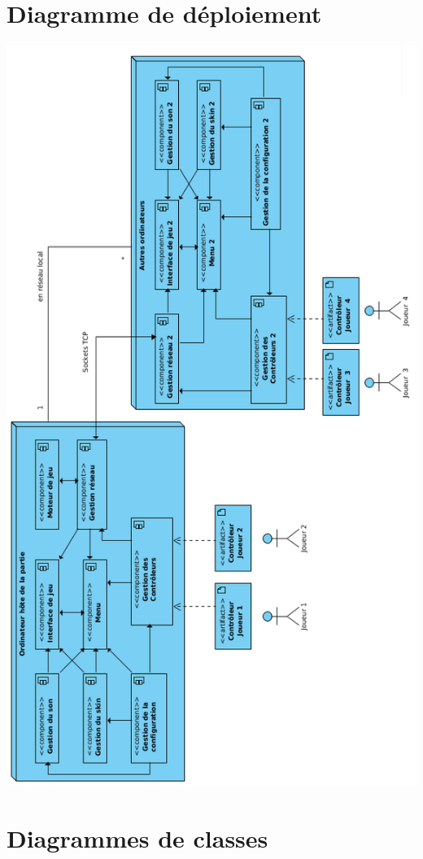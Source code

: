 \section{Diagramme de déploiement}

\begin{center}
\includegraphics[scale=0.62]{images/UML/deploiement.png}
\end{center}

\section{Diagrammes de classes}

